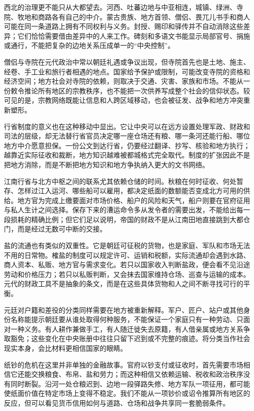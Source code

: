 西北的治理更不能只从大都望去。河西、吐蕃边地与中亚相连，城镇、绿洲、寺院、牧地和商路各有自己的中介。蒙古贵族、地方首领、僧侣、畏兀儿书手和商人可能在同一条道路上拥有不同权利与义务。封授、赐印和驿传并不自动消除这些差异；它们恰恰需要借由差异中的人来工作。碑刻和多语文书能显示局部官号、捐施或通行，不能把复杂的边地关系压成单一的“中央控制”。

僧侣与寺院在元代政治中常以朝廷礼遇或争议出现，但寺院首先也是土地、施主、经卷、手工业和旅行者相遇的地点。国家给予保护或限制，可能改变寺院的资格和经济空间；地方社会对寺院的依赖，则取决于交通、灾害、家族和市场。不能从一份敕令推论所有地区的宗教秩序，也不能把一次供养写成整个社会的信仰状态。较可见的是，宗教网络既能让信息和人跨区域移动，也会被征发、战争和地方冲突重新塑形。

行省制度的意义也在这种移动中显出。它让中央可以在远方设置处理军政、财政和司法的层级，却无法替行省官员决定哪一座仓场还有粮、哪一条河还能行船、哪位地方中介愿意担保。一份公文到达行省，仍要经过翻译、抄写、核验和地方执行；越靠近实际征收和裁断，地方知识越难被都城格式完全取代。制度的扩张因此不是把地方消除，而是不断把地方知识和地方争执纳入更大的文书网络。

江南行省与北方中枢之间的联系尤其依赖仓储的时间。秋粮在何时征收、何处暂存、怎样过江入运河、哪些船可以雇用，都决定纸面的数额能否变成北方可用的供给。地方官为完成上缴要面对市场价格、船户的风险和天气，船户则要在官府征用与私人生计之间选择。保存下来的漕运命令多从发令者的需要出发，不能给出每一段损耗的精确比例；但它们足以说明，帝国的财政不是从江南田地直接跳到大都仓门，而是经过无数可中断的交接。

盐的流通也有类似的双重性。它是朝廷可征税的货物，也是家庭、军队和市场无法不用的日常物。榷盐的制度可以规定许可、运销和税额，实际流通却会遇到水路、商人资本、私贩、地方官与需求变化。若只以国家收入判断盐政，便会看不见沿途劳动和价格压力；若只以私贩判断，又会抹去国家维持仓场、巡查与运输的成本。元代的财政工具不是抽象的条文，而是在这些具体货物和人之间不断寻找可行的平衡。

元廷对户籍和差役的分类同样需要在地方被重新解释。军户、匠户、站户或其他身份名称能提示朝廷要从谁处取得何种服务，不能保证一个家庭只有一种劳动、只面对一种义务。有人耕作兼做手工，有人随迁徙失去原籍，有人借亲属或地方关系争取豁免；这些变化在中央账册中往往只留下迟到或不完整的痕迹。将分类当作社会现实本身，会比材料更相信国家的眼睛。

纸钞的危机在这里并非单独的金融故事。官府以钞支付或征收时，首先需要市场相信它还能交换粮食、布帛、盐和劳力；而这种相信又依赖运输、税收和政治秩序没有同时断裂。沿河一处仓粮迟到、边地一段驿路失修、地方军队一项征用，都可能使纸面价值在特定市场上变得不稳定。我们不能从一项钞价或诏令推算所有地区的反应，但可以看见货币信用如何与道路、仓场和战争共享同一套脆弱条件。

